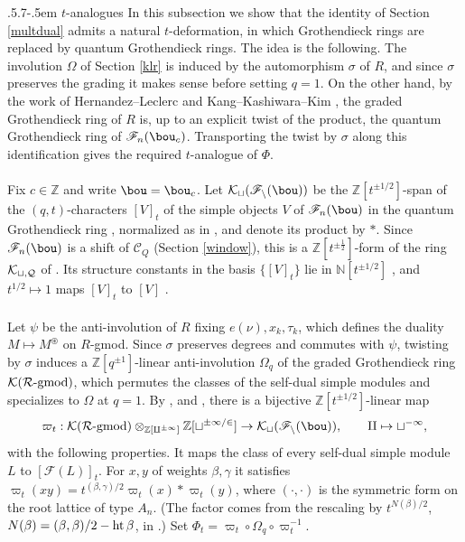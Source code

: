 \documentclass[11pt,reqno]{amsart}
\makeatletter
\theoremstyle{definition} \newtheorem*{defn}{Definition}
\theoremstyle{definition}
\numberwithin{equation}{section}
\def\subsection{\def\@secnumfont{\bfseries}\@startsection{subsection}{2}%
  {\parindent}{.5\linespacing\@plus.7\linespacing}{-.5em}%
  {\normalfont\bfseries}}
\makeatother
\begin{document}
\subsection{$t$-analogues}\label{tsec} In this subsection we show that the identity of Section \ref{multdual} admits a
natural $t$-deformation, in which Grothendieck rings are replaced by quantum Grothendieck rings. The idea is the
following. The involution $\Omega$ of Section \ref{klr} is induced by the automorphism $\sigma$ of $R$, and since $\sigma$
preserves the grading it makes sense before setting $q=1$. On the other hand, by the work of Hernandez--Leclerc
\cite{HL15} and Kang--Kashiwara--Kim \cite{KKK15}, the graded Grothendieck ring of $R$ is, up to an explicit twist of the
product, the quantum Grothendieck ring of $\mathscr F_n(\bou_c)$. Transporting the twist by $\sigma$ along this
identification gives the required $t$-analogue of $\Phi$.\\\\
 Fix $c\in\mathbb Z$ and write $\bou=\bou_c$. Let $\cal K_t(\mathscr F_n(\bou))$ be the
$\mathbb Z[t^{\pm1/2}]$-span of the $(q,t)$-characters $[V]_t$ of the simple objects $V$ of $\mathscr F_n(\bou)$ in the quantum
Grothendieck ring \cite{Nak04,VV03,Her04}, normalized as in \cite[Section 5]{HL15}, and denote its product by $*$. Since
$\mathscr F_n(\bou)$ is a shift of $\mathscr C_Q$ (Section \ref{window}), this is a $\mathbb Z[t^{\pm\frac12}]$-form of the ring $\cal K_{t,Q}$ of \cite[Section 5.12]{HL15}.
Its structure constants in the basis $\{[V]_t\}$ lie in $\mathbb N[t^{\pm1/2}]$ \cite{VV03}, and $t^{1/2}\mapsto1$ maps $[V]_t$ to
$[V]$ \cite[Theorem 5.2]{HL15}.
\\\\
Let $\psi$ be the anti-involution of $R$ fixing $e(\nu),x_k,\tau_k$, which defines the duality $M\mapsto M^\circledast$ on $R$-gmod.
Since $\sigma$ preserves degrees and commutes with $\psi$, twisting by $\sigma$ induces a $\mathbb Z[q^{\pm1}]$-linear anti-involution
$\Omega_q$ of the graded Grothendieck ring $\cal K(R\text{-gmod})$, which permutes the classes of the self-dual simple modules and
specializes to $\Omega$ at $q=1$. By \cite[Theorem 6.1]{HL15}, \cite[Corollary 4.3.5]{KKK15} and \cite{KL09,VV11}, there is a bijective
$\mathbb Z[t^{\pm1/2}]$-linear map
$$\varpi_t:\cal K(R\text{-gmod})\otimes_{\mathbb Z[q^{\pm1}]}\mathbb Z[t^{\pm1/2}]\to\cal K_t(\mathscr F_n(\bou)),\qquad q\mapsto t^{-1},$$
with the following properties. It maps the class of every self-dual simple module $L$ to $[\mathcal F(L)]_t$. For $x,y$ of
weights $\beta,\gamma$ it satisfies $\varpi_t(xy)=t^{(\beta,\gamma)/2}\varpi_t(x)*\varpi_t(y)$, where $(\cdot,\cdot)$ is the
symmetric form on the root lattice of type $A_n$. (The factor comes from the rescaling by $t^{N(\beta)/2}$,
$N(\beta)=(\beta,\beta)/2-{\rm ht}\,\beta$, in \cite[Theorem 6.1]{HL15}.) Set $\Phi_t=\varpi_t\circ\Omega_q\circ\varpi_t^{-1}$.
\end{document}
